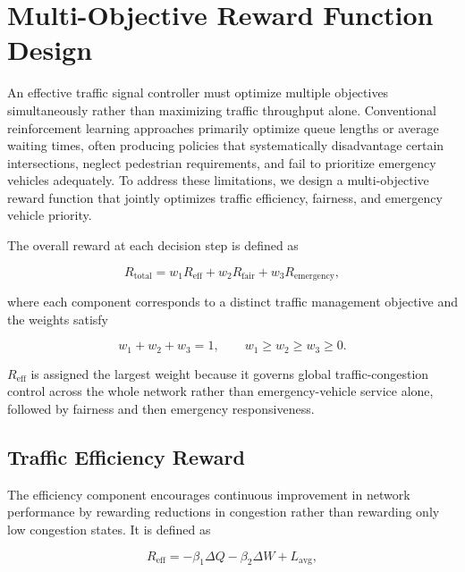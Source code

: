 \documentclass[3p,times]{elsarticle}
\theoremstyle{plain}
\theoremstyle{definition}
\begin{document}

\section{Multi-Objective Reward Function Design}\label{sec4}

An effective traffic signal controller must optimize multiple
objectives simultaneously rather than maximizing traffic throughput
alone. Conventional reinforcement learning approaches primarily
optimize queue lengths or average waiting times, often producing
policies that systematically disadvantage certain intersections,
neglect pedestrian requirements, and fail to prioritize emergency
vehicles adequately. To address these limitations, we design a
multi-objective reward function that jointly optimizes traffic
efficiency, fairness, and emergency vehicle priority.

The overall reward at each decision step is defined as

\begin{equation}
R_{\text{total}}
=
w_1 R_{\text{eff}}
+
w_2 R_{\text{fair}}
+
w_3 R_{\text{emergency}},
\end{equation}

where each component corresponds to a distinct traffic management
objective and the weights satisfy

\begin{equation}
w_1 + w_2 + w_3 = 1, \qquad w_1 \ge w_2 \ge w_3 \ge 0.
\end{equation}

$R_{\text{eff}}$ is assigned the largest weight because it governs
global traffic-congestion control across the whole network rather than
emergency-vehicle service alone, followed by fairness and then
emergency responsiveness.

\subsection{Traffic Efficiency Reward}

The efficiency component encourages continuous improvement in network
performance by rewarding reductions in congestion rather than
rewarding only low congestion states. It is defined as

\begin{equation}
R_{\text{eff}}
=
-\beta_1 \Delta Q
-\beta_2 \Delta W
+
L_{\text{avg}},
\end{equation}
\end{document}
